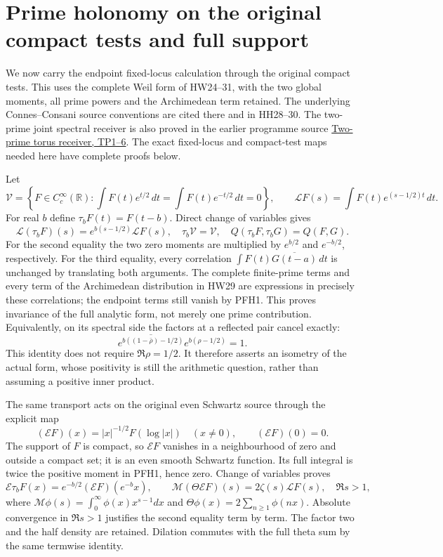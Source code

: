 \documentclass[11pt,a4paper]{article}
\theoremstyle{definition}\newtheorem{definition}[theorem]{Definition}
\begin{document}
\section{Prime holonomy on the original compact tests and full support}
\label{sec:pfh}

We now carry the endpoint fixed-locus calculation through the original
compact tests. This uses the complete Weil form of HW24--31, with
the two global moments, all prime powers and the Archimedean term
retained. The underlying Connes--Consani source conventions are cited
there and in HH28--30. The two-prime joint spectral receiver is also
proved in the earlier programme source
\href{https://github.com/KokunoYumeto/zeta-function-research-reader/blob/5a89872598df0902b7c1393cf8e4692ca3010a95/workbenches/splitzero-tandem/continuations/20260923-cohomology-heat-residue/graph-pulse/FULL_RECONSTRUCTION.tex}{Two-prime torus receiver, TP1--6}.
The exact fixed-locus and compact-test maps needed here have complete
proofs below.

Let
\[
 \mathcal V=\left\{F\in C_c^\infty(\mathbb R):
    \int F(t)e^{t/2}\,dt=\int F(t)e^{-t/2}\,dt=0\right\},
 \qquad \mathcal L F(s)=\int F(t)e^{(s-1/2)t}\,dt.
 \tag{PFH1}
\]
For real $b$ define $\tau_bF(t)=F(t-b)$. Direct change of variables
gives
\[
 \mathcal L(\tau_bF)(s)=e^{b(s-1/2)}\mathcal LF(s),\quad
 \tau_b\mathcal V=\mathcal V,\quad
 Q(\tau_bF,\tau_bG)=Q(F,G).
 \tag{PFH2}
\]
For the second equality the two zero moments are multiplied by
$e^{b/2}$ and $e^{-b/2}$, respectively. For the third equality,
every correlation
$\int F(t)\overline{G(t-a)}\,dt$ is unchanged by translating
both arguments. The complete finite-prime terms and every term of
the Archimedean distribution in HW29 are expressions in precisely
these correlations; the endpoint terms still vanish by PFH1.
This proves invariance of the full analytic form, not merely one
prime contribution. Equivalently, on its spectral side the factors
at a reflected pair cancel exactly:
\[
 \overline{e^{b((1-\bar\rho)-1/2)}}
                    e^{b(\rho-1/2)}=1.
\]
This identity does not require $\Re\rho=1/2$. It therefore
asserts an isometry of the actual form, whose positivity is still
the arithmetic question, rather than assuming a positive inner product.

The same transport acts on the original even Schwartz source through
the explicit map
\[
 (\mathcal EF)(x)=|x|^{-1/2}F(\log|x|)\quad(x\ne0),
       \qquad(\mathcal EF)(0)=0.
 \tag{PFH3}
\]
The support of $F$ is compact, so $\mathcal EF$ vanishes in a
neighbourhood of zero and outside a compact set; it is an even
smooth Schwartz function. Its full integral is twice the positive
moment in PFH1, hence zero. Change of variables proves
\[
 \mathcal E\tau_bF(x)=e^{-b/2}(\mathcal EF)(e^{-b}x),\qquad
 \mathcal M(\Theta\mathcal EF)(s)=2\zeta(s)\mathcal LF(s),
       \quad\Re s>1,
 \tag{PFH4}
\]
where $\mathcal M\phi(s)=\int_0^\infty\phi(x)x^{s-1}dx$ and
$\Theta\phi(x)=2\sum_{n\ge1}\phi(nx)$. Absolute convergence in
$\Re s>1$ justifies the second equality term by term. The factor
two and the half density are retained. Dilation commutes with the
full theta sum by the same termwise identity.
\end{document}

